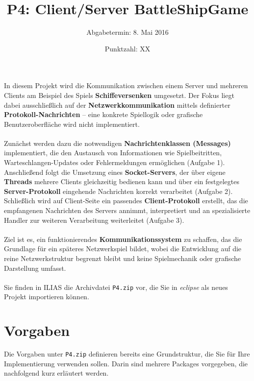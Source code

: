 \documentclass[12pt]{article}
\begin{document}


\title{\textbf{P4: Client/Server BattleShipGame}}
\author{Abgabetermin: 8. Mai 2016}
\date{Punktzahl: XX}
\maketitle

\subsection*{}

In diesem Projekt wird die Kommunikation zwischen einem Server und mehreren Clients am Beispiel 
des Spiels \textbf{Schiffeversenken} umgesetzt. Der Fokus liegt dabei ausschließlich auf der
\textbf{Netzwerkkommunikation} mittels definierter \textbf{Protokoll-Nachrichten} -- eine 
konkrete Spiellogik oder grafische Benutzeroberfläche wird nicht implementiert.
\\ \\
Zunächst werden dazu die notwendigen \textbf{Nachrichtenklassen (Messages)} implementiert, die
den Austausch von Informationen wie Spielbeitritten, Warteschlangen-Updates oder Fehlermeldungen
ermöglichen (Aufgabe 1). Anschließend folgt die Umsetzung eines \textbf{Socket-Servers}, der über
eigene \textbf{Threads} mehrere Clients gleichzeitig bedienen kann und über ein festgelegtes
\textbf{Server-Protokoll} eingehende Nachrichten korrekt verarbeitet (Aufgabe 2). Schließlich
wird auf Client-Seite ein passendes \textbf{Client-Protokoll} erstellt, das die empfangenen
Nachrichten des Servers annimmt, interpretiert und an spezialisierte Handler zur weiteren
Verarbeitung weiterleitet (Aufgabe 3).
\\ \\
Ziel ist es, ein funktionierendes \textbf{Kommunikationssystem} zu schaffen, das die Grundlage
für ein späteres Netzwerkspiel bildet, wobei die Entwicklung auf die reine Netzwerkstruktur
begrenzt bleibt und keine Spielmechanik oder grafische Darstellung umfasst.
\\ \\
Sie finden in ILIAS die Archivdatei \texttt{P4.zip} vor, die Sie in \emph{eclipse} als neues
Projekt importieren können.


\section*{Vorgaben}
Die Vorgaben unter \texttt{P4.zip} definieren bereits eine Grundstruktur, die
Sie für Ihre Implementierung verwenden sollen. Darin sind mehrere Packages
vorgegeben, die nachfolgend kurz erläutert werden. 
\end{document}
